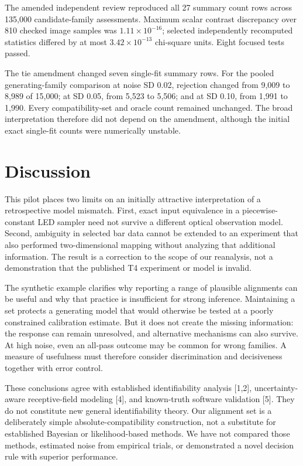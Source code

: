 \documentclass[11pt,letterpaper]{article}
\begin{document}
The amended independent review reproduced all 27 summary count rows across 135,000 candidate-family assessments. Maximum scalar contrast discrepancy over 810 checked image samples was $1.11\times10^{-16}$; selected independently recomputed statistics differed by at most $3.42\times10^{-13}$ chi-square units. Eight focused tests passed.


The tie amendment changed seven single-fit summary rows. For the pooled generating-family comparison at noise SD 0.02, rejection changed from 9,009 to 8,989 of 15,000; at SD 0.05, from 5,523 to 5,506; and at SD 0.10, from 1,991 to 1,990. Every compatibility-set and oracle count remained unchanged. The broad interpretation therefore did not depend on the amendment, although the initial exact single-fit counts were numerically unstable.


\section{Discussion}

This pilot places two limits on an initially attractive interpretation of a retrospective model mismatch. First, exact input equivalence in a piecewise-constant LED sampler need not survive a different optical observation model. Second, ambiguity in selected bar data cannot be extended to an experiment that also performed two-dimensional mapping without analyzing that additional information. The result is a correction to the scope of our reanalysis, not a demonstration that the published T4 experiment or model is invalid.


The synthetic example clarifies why reporting a range of plausible alignments can be useful and why that practice is insufficient for strong inference. Maintaining a set protects a generating model that would otherwise be tested at a poorly constrained calibration estimate. But it does not create the missing information: the response can remain unresolved, and alternative mechanisms can also survive. At high noise, even an all-pass outcome may be common for wrong families. A measure of usefulness must therefore consider discrimination and decisiveness together with error control.


These conclusions agree with established identifiability analysis [1,2], uncertainty-aware receptive-field modeling [4], and known-truth software validation [5]. They do not constitute new general identifiability theory. Our alignment set is a deliberately simple absolute-compatibility construction, not a substitute for established Bayesian or likelihood-based methods. We have not compared those methods, estimated noise from empirical trials, or demonstrated a novel decision rule with superior performance.
\end{document}
